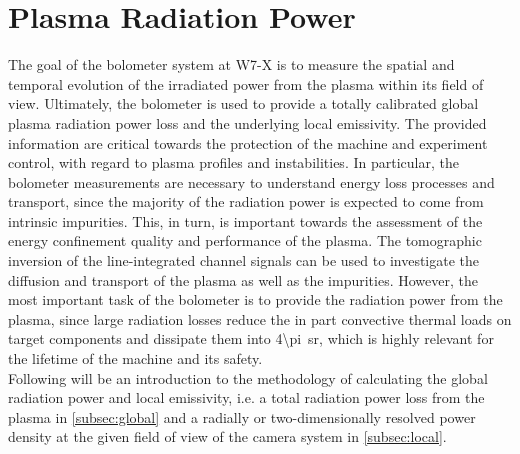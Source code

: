     \section{Plasma Radiation Power}\label{sec:rad_powerloss}%
%
        The goal of the bolometer system at W7-X is to measure the spatial and temporal evolution of the irradiated power from the plasma within its field of view. Ultimately, the bolometer is used to provide a totally calibrated global plasma radiation power loss and the underlying local emissivity. The provided information are critical towards the protection of the machine and experiment control, with regard to plasma profiles and instabilities\cite{Zhang2010,Grulke2018}. In particular, the bolometer measurements are necessary to understand  energy loss processes and transport, since the majority of the radiation power is expected to come from intrinsic impurities\cite{Zhang2014,Zhang2019}. This, in turn, is important towards the assessment of the energy confinement quality and performance of the plasma\cite{Fuchert2018}. The tomographic inversion of the line-integrated channel signals can be used to investigate the diffusion and transport of the plasma as well as the impurities\cite{Murari2007}. However, the most important task of the bolometer is to provide the radiation power from the plasma, since large radiation losses reduce the in part convective thermal loads on target components and dissipate them into \SI[parse-numbers=false]{4\pi}{\steradian}, which is highly relevant for the lifetime of the machine and its safety\cite{Arnoux2011}.\\%
        Following will be an introduction to the methodology of calculating the global radiation power and local emissivity, i.e. a total radiation power loss from the plasma in \cref{subsec:global} and a radially or two-dimensionally resolved power density at the given field of view of the camera system in \cref{subsec:local}.
%
